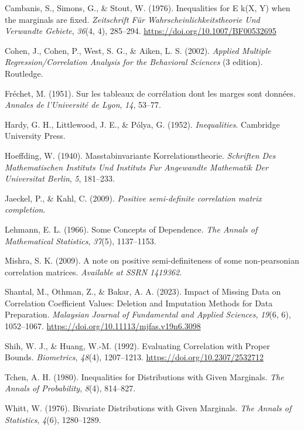\documentclass[
  12pt,
]{article}
\newlength{\cslhangindent}
\newenvironment{CSLReferences}[2] %
 {\begin{list}{}{%
  \setlength{\itemindent}{0pt}
  \setlength{\leftmargin}{0pt}
  \setlength{\parsep}{0pt}
  \ifodd #1
   \setlength{\leftmargin}{\cslhangindent}
   \setlength{\itemindent}{-1\cslhangindent}
  \fi
  \setlength{\itemsep}{#2\baselineskip}}}
 {\end{list}}
\theoremstyle{plain}
\theoremstyle{definition}
\theoremstyle{remark}
\begin{document}
\label{refs}
\begin{CSLReferences}{1}{0}
Cambanis, S., Simons, G., \& Stout, W. (1976). Inequalities for {E}
k({X}, {Y}) when the marginals are fixed. \emph{Zeitschrift Für
Wahrscheinlichkeitstheorie Und Verwandte Gebiete}, \emph{36}(4, 4),
285--294. \url{https://doi.org/10.1007/BF00532695}

Cohen, J., Cohen, P., West, S. G., \& Aiken, L. S. (2002). \emph{Applied
{Multiple Regression}/{Correlation Analysis} for the {Behavioral
Sciences}} (3 edition). Routledge.

Fréchet, M. (1951). Sur les tableaux de corrélation dont les marges sont
données. \emph{Annales de l'Université de Lyon}, \emph{14}, 53--77.

Hardy, G. H., Littlewood, J. E., \& Pólya, G. (1952).
\emph{Inequalities}. Cambridge University Press.

Hoeffding, W. (1940). Masstabinvariante {Korrelationstheorie}.
\emph{Schriften Des Mathematischen Instituts Und Instituts Fur
Angewandte Mathematik Der Universitat Berlin}, \emph{5}, 181--233.

Jaeckel, P., \& Kahl, C. (2009). \emph{Positive semi-definite
correlation matrix completion}.

Lehmann, E. L. (1966). Some {Concepts} of {Dependence}. \emph{The Annals
of Mathematical Statistics}, \emph{37}(5), 1137--1153.

Mishra, S. K. (2009). A note on positive semi-definiteness of some
non-pearsonian correlation matrices. \emph{Available at SSRN 1419362}.

Shantal, M., Othman, Z., \& Bakar, A. A. (2023). Impact of {Missing
Data} on {Correlation Coefficient Values}: {Deletion} and {Imputation
Methods} for {Data Preparation}. \emph{Malaysian Journal of Fundamental
and Applied Sciences}, \emph{19}(6, 6), 1052--1067.
\url{https://doi.org/10.11113/mjfas.v19n6.3098}

Shih, W. J., \& Huang, W.-M. (1992). Evaluating {Correlation} with
{Proper Bounds}. \emph{Biometrics}, \emph{48}(4), 1207--1213.
\url{https://doi.org/10.2307/2532712}

Tchen, A. H. (1980). Inequalities for {Distributions} with {Given
Marginals}. \emph{The Annals of Probability}, \emph{8}(4), 814--827.

Whitt, W. (1976). Bivariate {Distributions} with {Given Marginals}.
\emph{The Annals of Statistics}, \emph{4}(6), 1280--1289.

\end{CSLReferences}
\end{document}
